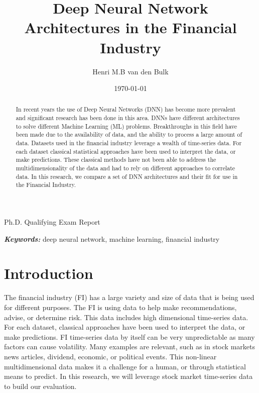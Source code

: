 \documentclass[11pt]{article}
\providecommand{\keywords}[1]{\textbf{\textit{Keywords: }} #1}
\begin{document}
\title{\LARGE Deep Neural Network Architectures in the Financial Industry}
\author{Henri M.B van den Bulk}
\date{\today}
\maketitle
\begin{center}
Ph.D. Qualifying Exam Report
\end{center}



\begin{abstract}
In recent years the use of Deep Neural Networks (DNN) has become more prevalent and significant research has been done in this area. DNNs have different architectures to solve different Machine Learning (ML) problems. Breakthroughs in this field have been made due to the availability of data, and the ability to process a large amount of data. Datasets used in the financial industry leverage a wealth of time-series data. For each dataset classical statistical approaches have been used to interpret the data, or make predictions. These classical methods have not been able to address the multidimensionality of the data and had to rely on different approaches to correlate data.
In this research, we compare a set of DNN architectures and their fit for use in the Financial Industry.
\end{abstract}
\keywords{deep neural network, machine learning, financial industry}

\section{Introduction} \label{sec:introduction}
The financial industry (FI) has a large variety and size of data that is being used for different purposes. The FI is using data to help make recommendations, advise, or determine risk. This data includes high dimensional time-series data. For each dataset, classical approaches have been used to interpret the data, or make predictions. FI time-series data by itself can be very unpredictable as many factors can cause volatility. Many examples are relevant, such as in stock markets news articles, dividend, economic, or political events. This non-linear multidimensional data makes it a challenge for a human, or through statistical means to predict. In this research, we will leverage stock market time-series data to build our evaluation.
\end{document}
